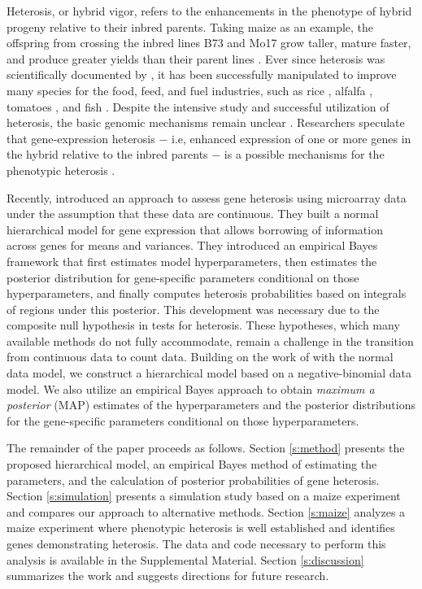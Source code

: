\documentclass[useAMS,usenatbib,referee]{biom}
\begin{document}
Heterosis, or hybrid vigor, refers to the enhancements in the phenotype of hybrid progeny relative to their inbred parents. Taking maize as an example, the offspring from crossing the inbred lines B73 and Mo17 grow taller, mature faster, and produce greater yields than their parent lines \citep{hallauer1981quantitative, hallauer2010quantitative}. Ever since heterosis was scientifically documented by \cite{darwin1876effects}, it has been successfully manipulated to improve many species for the food, feed, and fuel industries, such as rice \citep{yu1997importance}, alfalfa \citep{riday2002heterosis}, tomatoes \citep{krieger2010flowering}, and fish \citep{wohlfarth1993heterosis}. Despite the intensive study and successful utilization of heterosis, the basic genomic mechanisms remain unclear \citep{coors1999genetics, lippman2007heterosis}. Researchers speculate that gene-expression heterosis $-$ i.e, enhanced expression of one or more genes in the hybrid relative to the inbred parents $-$ is a possible  mechanisms for the phenotypic heterosis \citep{swanson2006all, springer2007allelic}.

Recently, \cite{ji2014estimation} introduced an approach to assess gene heterosis using microarray data under the assumption that these data are continuous. They built a normal hierarchical model for gene expression that allows borrowing of information across genes for means and variances. They introduced an empirical Bayes framework that first estimates model hyperparameters, then estimates the posterior distribution for gene-specific parameters conditional on those hyperparameters, and finally computes heterosis probabilities based on integrals of regions under this posterior. This development was necessary due to the composite null hypothesis in tests for heterosis. These hypotheses, which many available methods do not fully accommodate, remain a challenge in the transition from continuous data to count data. Building on the work of \citeauthor{ji2014estimation} with the normal data model, we construct a hierarchical model based on a negative-binomial data model. We also utilize an empirical Bayes approach to obtain \emph{maximum a posterior} (MAP) estimates of the hyperparameters and the posterior distributions for the gene-specific parameters conditional on those hyperparameters. 

The remainder of the paper proceeds as follows. Section \ref{s:method} presents the proposed hierarchical model, an empirical Bayes method of estimating the parameters, and the calculation of posterior probabilities of gene heterosis. Section \ref{s:simulation} presents a simulation study based on a maize experiment and compares our approach to alternative methods. Section \ref{s:maize} analyzes a maize experiment where phenotypic heterosis is well established and identifies genes demonstrating heterosis. The data and code necessary to perform this analysis is available in the Supplemental Material. Section \ref{s:discussion} summarizes the work and suggests directions for future research.
\end{document}
